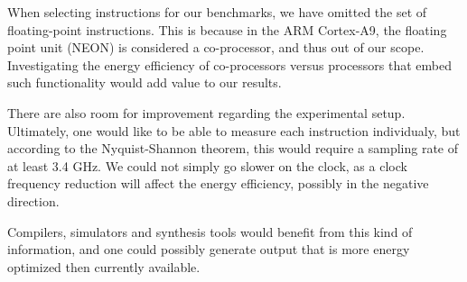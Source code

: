 When selecting instructions for our benchmarks, we have omitted the set of
floating-point instructions. This is because in the ARM Cortex-A9, the floating
point unit (NEON) is considered a co-processor\cite{armtech}, and thus out of
our scope. Investigating the energy efficiency of co-processors versus
processors that embed such functionality would add value to our results.

There are also room for improvement regarding the experimental setup.
Ultimately, one would like to be able to measure each instruction individualy,
but according to the Nyquist-Shannon theorem\cite{shannon1949communication},
this would require a sampling rate of at least 3.4 GHz. We could not simply go
slower on the clock, as a clock frequency reduction will affect the energy
efficiency, possibly in the negative direction\cite{burd1995energy}.

Compilers, simulators and synthesis tools would benefit from this kind of
information, and one could possibly generate output that is more energy
optimized then currently available.
